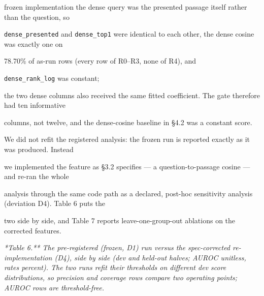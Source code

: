 frozen implementation the dense query was the presented passage itself rather than the question, so

\texttt{dense\_presented} and \texttt{dense\_top1} were identical to each other, the dense cosine was exactly one on

78.70\% of as-run rows (every row of R0--R3, none of R4), and

\texttt{dense\_rank\_log} was constant;

the two dense columns also received the same fitted coefficient. The gate therefore had ten informative

columns, not twelve, and the dense-cosine baseline in §4.2 was a constant score.

We did not refit the registered analysis: the frozen run is reported exactly as it was produced. Instead

we implemented the feature as §3.2 specifies --- a question-to-passage cosine --- and re-ran the whole

analysis through the same code path as a declared, post-hoc sensitivity analysis (deviation D4). Table 6 puts the

two side by side, and Table 7 reports leave-one-group-out ablations on the corrected features.

\textit{*Table 6.** The pre-registered (frozen, D1) run versus the spec-corrected re-implementation (D4), side by side (dev and held-out halves; AUROC unitless, rates percent). The two runs refit their thresholds on different dev score distributions, so precision and coverage rows compare two operating points; AUROC rows are threshold-free.}

